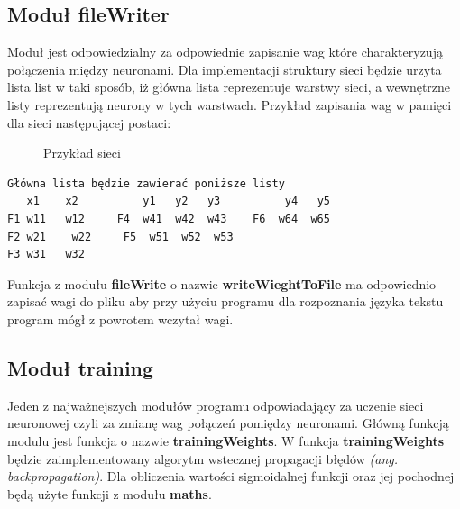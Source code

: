\documentclass[8pt]{article}
\begin{document}
\subsection{Moduł fileWriter} 
\hspace*{1 cm}Moduł jest odpowiedzialny za odpowiednie zapisanie wag które charakteryzują połączenia między neuronami. \newline \hspace*{1 cm} Dla implementacji struktury sieci będzie urzyta lista list w taki sposób, iż główna lista reprezentuje warstwy sieci, a wewnętrzne listy reprezentują neurony w tych warstwach.\newline
\hspace*{1 cm} Przykład zapisania wag w pamięci dla sieci następującej postaci:
\begin{figure}[h]
\caption{Przykład sieci}
\label{fig:image}
\end{figure}
\begin{verbatim}
Główna lista będzie zawierać poniższe listy
   x1    x2          y1   y2   y3          y4   y5
F1 w11   w12     F4  w41  w42  w43    F6  w64  w65
F2 w21	  w22     F5  w51  w52  w53
F3 w31   w32
\end{verbatim}
\hspace*{1 cm} Funkcja  z modułu \textbf{fileWrite} o nazwie \textbf{writeWieghtToFile} ma odpowiednio zapisać wagi do pliku aby przy użyciu programu dla rozpoznania języka tekstu program mógł z powrotem wczytał wagi.
\subsection{Moduł training}
\hspace*{1 cm} Jeden z najważnejszych modułów programu odpowiadający za uczenie sieci neuronowej czyli za zmianę wag połączeń pomiędzy neuronami. Główną funkcją modulu jest funkcja o nazwie \textbf{trainingWeights}. W funkcja \textbf{trainingWeights} będzie zaimplementowany algorytm  wstecznej propagacji błędów \textit{(ang. backpropagation)}. Dla obliczenia wartości sigmoidalnej funkcji oraz jej pochodnej będą użyte funkcji z modułu \textbf{maths}.
\end{document}
